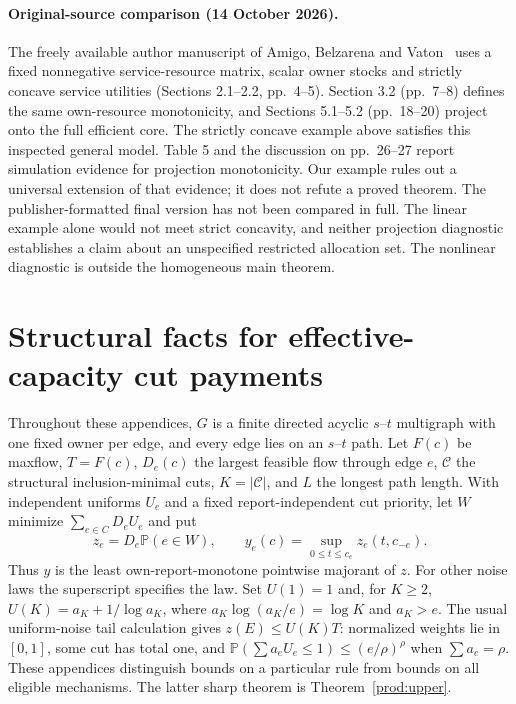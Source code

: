 \documentclass[11pt]{article}
\theoremstyle{definition}\newtheorem{definition}[theorem]{Definition}
\theoremstyle{remark}\newtheorem{remark}[theorem]{Remark}
\newcommand{\Prob}{\mathbb P}
\begin{document}
\paragraph{Original-source comparison (14 October 2026).}
The freely available author manuscript of Amigo, Belzarena and Vaton~\cite{ABV}
uses a fixed nonnegative service-resource matrix, scalar owner stocks and
strictly concave service utilities (Sections 2.1--2.2, pp.\ 4--5).
Section 3.2 (pp.\ 7--8) defines the same own-resource monotonicity, and
Sections 5.1--5.2 (pp.\ 18--20) project onto the full efficient core.
The strictly concave example above satisfies this inspected general model.
Table 5 and the discussion on pp.\ 26--27 report simulation evidence for
projection monotonicity. Our example rules out a universal extension of that
evidence; it does not refute a proved theorem. The publisher-formatted final
version has not been compared in full. The linear example alone would not
meet strict concavity, and neither projection diagnostic establishes a claim
about an unspecified restricted allocation set. The nonlinear diagnostic is
outside the homogeneous main theorem.

\section{Structural facts for effective-capacity cut payments}\label{noise:structure}
Throughout these appendices, $G$ is a finite directed acyclic $s$--$t$
multigraph with one fixed owner per edge, and every edge lies on an $s$--$t$
path. Let $F(c)$ be maxflow, $T=F(c)$, $D_e(c)$ the largest feasible flow
through edge $e$, $\mathcal C$ the structural inclusion-minimal cuts,
$K=|\mathcal C|$, and $L$ the longest path length. With independent uniforms
$U_e$ and a fixed report-independent cut priority, let $W$ minimize
$\sum_{e\in C}D_eU_e$ and put
\[
 z_e=D_e\Prob(e\in W),\qquad y_e(c)=\sup_{0\le t\le c_e}z_e(t,c_{-e}).
\]
Thus $y$ is the least own-report-monotone pointwise majorant of $z$.
For other noise laws the superscript specifies the law. Set $U(1)=1$ and,
for $K\ge2$, $U(K)=a_K+1/\log a_K$, where
$a_K\log(a_K/e)=\log K$ and $a_K>e$.
The usual uniform-noise tail calculation gives $z(E)\le U(K)T$:
normalized weights lie in $[0,1]$, some cut has total one, and
$\Prob(\sum a_eU_e\le1)\le(e/\rho)^\rho$ when $\sum a_e=\rho$.
These appendices distinguish bounds on a particular rule from bounds on
all eligible mechanisms. The latter sharp theorem is Theorem~\ref{prod:upper}.
\end{document}
